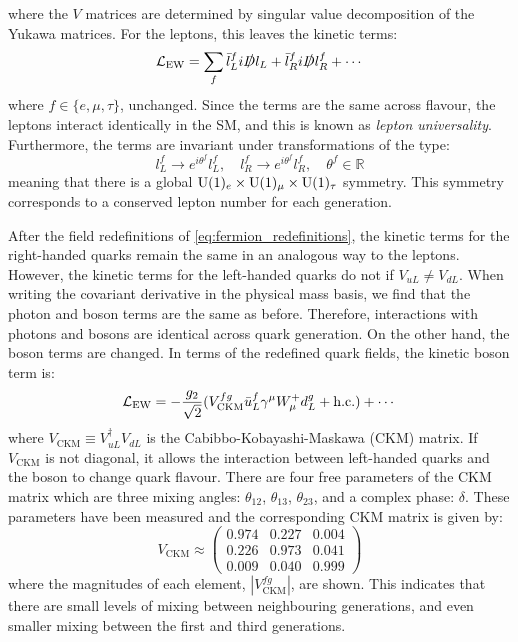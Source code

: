 where the $V$ matrices are determined by singular value decomposition of the Yukawa matrices. For the leptons, this leaves the kinetic terms:
\begin{equation}
  \mathcal{L}_\mathrm{EW} =  \sum_f \bar{l}_L^f i \slashed{D} l_L + \bar{l}_R^f i \slashed{D} l_R^f + \cdots
\end{equation}
where $f \in \{e, \mu, \tau\}$, unchanged. Since the terms are the same across flavour, the leptons interact identically in the SM, and this is known as \textit{lepton universality}. Furthermore, the terms are invariant under transformations of the type:
\begin{equation}
  l_L^f \to e^{i\theta^f} l_L^f, \quad l_R^f \to e^{i\theta^f} l_R^f, \quad \theta^f \in \mathbb{R}
\end{equation}
meaning that there is a global $\mathrm{U}(1)_e \times \mathrm{U}(1)_\mu \times \mathrm{U}(1)_\tau$ symmetry. This symmetry corresponds to a conserved lepton number for each generation.

After the field redefinitions of \cref{eq:fermion_redefinitions}, the kinetic terms for the right-handed quarks remain the same in an analogous way to the leptons. However, the kinetic terms for the left-handed quarks do not if $V_{uL} \neq V_{dL}$. When writing the covariant derivative in the physical mass basis, we find that the photon and \PZ boson terms are the same as before. Therefore, interactions with photons and \PZ bosons are identical across quark generation. On the other hand, the \PW boson terms are changed. In terms of the redefined quark fields, the kinetic \PW boson term is:
\begin{equation}
  \mathcal{L}_\mathrm{EW} = - \frac{g_2}{\sqrt{2}} ( V^{fg}_{\text{CKM}} \bar{u}_L^f \gamma^\mu W_\mu^+ d_L^g + \text{h.c.} ) + \cdots
\end{equation}
where $V_{\text{CKM}} \equiv V_{uL}^\dag V_{dL}$ is the Cabibbo-Kobayashi-Maskawa (CKM) matrix. If $V_{\text{CKM}}$ is not diagonal, it allows the interaction between left-handed quarks and the \PW boson to change quark flavour. There are four free parameters of the CKM matrix which are three mixing angles: $\theta_{12}$, $\theta_{13}$, $\theta_{23}$, and a complex phase: $\delta$. These parameters have been measured and the corresponding CKM matrix is given by:
\begin{equation}
  V_{\text{CKM}} \approx
  \begin{pmatrix}
    0.974 & 0.227 & 0.004 \\
    0.226 & 0.973 & 0.041 \\
    0.009 & 0.040 & 0.999
  \end{pmatrix}
\end{equation}
where the magnitudes of each element, $|V_{\text{CKM}}^{fg}|$, are shown. This indicates that there are small levels of mixing between neighbouring generations, and even smaller mixing between the first and third generations.

